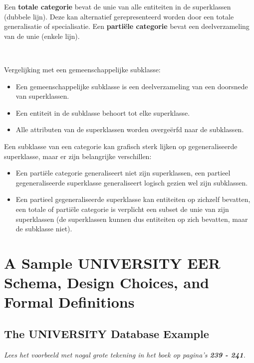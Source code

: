 Een \textbf{totale categorie} bevat de unie van alle entiteiten in de superklassen (dubbele lijn). Deze kan alternatief gerepresenteerd worden door een totale generalisatie of specialisatie. Een \textbf{parti\"ele categorie} bevat een deelverzameling van de unie (enkele lijn).

~

\noindent Vergelijking met een gemeenschappelijke subklasse:
\begin{itemize}
\item Een gemeenschappelijke subklasse is een deelverzameling van een doorsnede van superklassen.
\item Een entiteit in de subklasse behoort tot elke superklasse.
\item Alle attributen van de superklassen worden overge\"erfd naar de subklassen.
\end{itemize}


\noindent Een subklasse van een categorie kan grafisch sterk lijken op gegeneraliseerde superklasse, maar er zijn belangrijke verschillen:
\begin{itemize}
\item Een parti\"ele categorie generaliseert niet zijn superklassen, een partieel gegeneraliseerde superklasse generaliseert logisch gezien wel zijn subklassen.
\item Een partieel gegeneraliseerde superklasse kan entiteiten op zichzelf bevatten, een totale of parti\"ele categorie is verplicht een subset de unie van zijn superklassen (de superklassen kunnen dus entiteiten op zich bevatten, maar de subklasse niet).
\end{itemize}


\section{A Sample UNIVERSITY EER Schema, Design Choices, and Formal Definitions}
\subsection{The UNIVERSITY Database Example}
\textit{Lees het voorbeeld met nogal grote tekening in het boek op pagina's \textbf{239 - 241}.}


